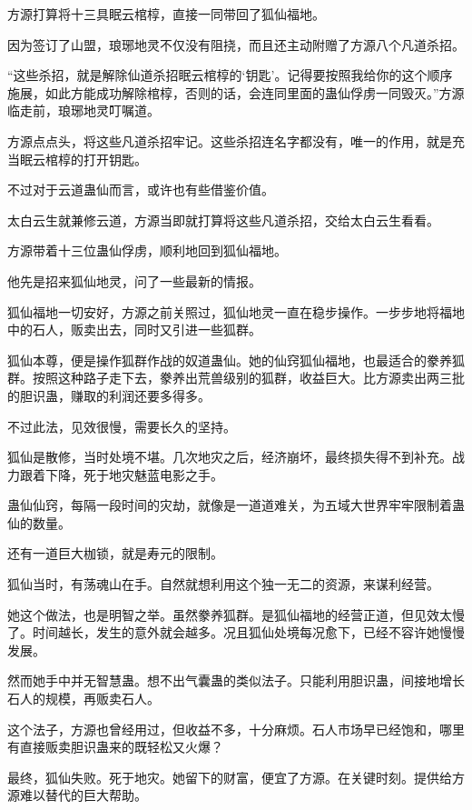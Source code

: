 
\begin{this_body}

方源打算将十三具眠云棺椁，直接一同带回了狐仙福地。

因为签订了山盟，琅琊地灵不仅没有阻挠，而且还主动附赠了方源八个凡道杀招。

“这些杀招，就是解除仙道杀招眠云棺椁的‘钥匙’。记得要按照我给你的这个顺序施展，如此方能成功解除棺椁，否则的话，会连同里面的蛊仙俘虏一同毁灭。”方源临走前，琅琊地灵叮嘱道。

方源点点头，将这些凡道杀招牢记。这些杀招连名字都没有，唯一的作用，就是充当眠云棺椁的打开钥匙。

不过对于云道蛊仙而言，或许也有些借鉴价值。

太白云生就兼修云道，方源当即就打算将这些凡道杀招，交给太白云生看看。

方源带着十三位蛊仙俘虏，顺利地回到狐仙福地。

他先是招来狐仙地灵，问了一些最新的情报。

狐仙福地一切安好，方源之前关照过，狐仙地灵一直在稳步操作。一步步地将福地中的石人，贩卖出去，同时又引进一些狐群。

狐仙本尊，便是操作狐群作战的奴道蛊仙。她的仙窍狐仙福地，也最适合的豢养狐群。按照这种路子走下去，豢养出荒兽级别的狐群，收益巨大。比方源卖出两三批的胆识蛊，赚取的利润还要多得多。

不过此法，见效很慢，需要长久的坚持。

狐仙是散修，当时处境不堪。几次地灾之后，经济崩坏，最终损失得不到补充。战力跟着下降，死于地灾魅蓝电影之手。

蛊仙仙窍，每隔一段时间的灾劫，就像是一道道难关，为五域大世界牢牢限制着蛊仙的数量。

还有一道巨大枷锁，就是寿元的限制。

狐仙当时，有荡魂山在手。自然就想利用这个独一无二的资源，来谋利经营。

她这个做法，也是明智之举。虽然豢养狐群。是狐仙福地的经营正道，但见效太慢了。时间越长，发生的意外就会越多。况且狐仙处境每况愈下，已经不容许她慢慢发展。

然而她手中并无智慧蛊。想不出气囊蛊的类似法子。只能利用胆识蛊，间接地增长石人的规模，再贩卖石人。

这个法子，方源也曾经用过，但收益不多，十分麻烦。石人市场早已经饱和，哪里有直接贩卖胆识蛊来的既轻松又火爆？

最终，狐仙失败。死于地灾。她留下的财富，便宜了方源。在关键时刻。提供给方源难以替代的巨大帮助。


\end{this_body}
